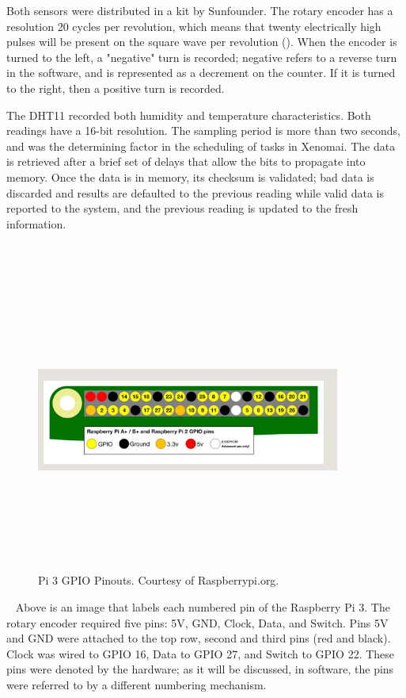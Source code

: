\documentclass[letterpaper, 12pt]{article}
\begin{document}
Both sensors were distributed in a kit by Sunfounder.  The rotary encoder has a resolution 20 cycles per revolution, which means that twenty electrically high pulses will be present on the square wave per revolution (\cite{artofcircuits2018}).  When the encoder is turned to the left, a "negative" turn is recorded; negative refers to a reverse turn in the software, and is represented as a decrement on the counter.  If it is turned to the right, then a positive turn is recorded.  

\indent The DHT11 recorded both humidity and temperature characteristics.  Both readings have a 16-bit resolution.  The sampling period is more than two seconds, and was the determining factor in the scheduling of tasks in Xenomai. The data is retrieved after a brief set of delays that allow the bits to propagate into memory.  Once the data is in memory, its checksum is validated; bad data is discarded and results are defaulted to the previous reading while valid data is reported to the system, and the previous reading is updated to the fresh information.

~\newline
~\newline
\begin{figure}[H]
	\centering
	\includegraphics[width=10cm,height=10cm,keepaspectratio]{pi_GPIO.png}
	\caption[GPIO]{Pi 3 GPIO Pinouts. Courtesy of Raspberrypi.org.}
	\label{fig:GPIO}
\end{figure}

~\newpage
Above is an image that labels each numbered pin of the Raspberry Pi 3.
The rotary encoder required five pins: 5V, GND, Clock, Data, and Switch.  Pins 5V and GND were attached to the top row, second and third pins (red and black). Clock was wired to GPIO 16, Data to GPIO 27, and Switch to GPIO 22.  These pins were denoted by the hardware; as it will be discussed, in software, the pins were referred to by a different numbering mechanism.
\end{document}
